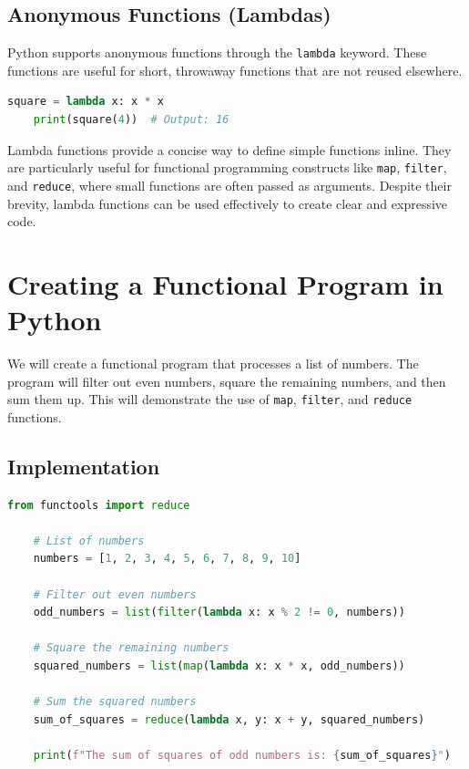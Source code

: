 \documentclass[a4paper]{article}
\begin{document}
\subsection{Anonymous Functions (Lambdas)}
Python supports anonymous functions through the \texttt{lambda} keyword. These functions are useful for short, throwaway functions that are not reused elsewhere.\\

\begin{lstlisting}[language=Python, caption=Anonymous Functions (Lambdas)]
    square = lambda x: x * x
    print(square(4))  # Output: 16
\end{lstlisting}

Lambda functions provide a concise way to define simple functions inline. They are particularly useful for functional programming constructs like \texttt{map}, \texttt{filter}, and \texttt{reduce}, where small functions are often passed as arguments. Despite their brevity, lambda functions can be used effectively to create clear and expressive code.\\

\newpage
\section{Creating a Functional Program in Python}
We will create a functional program that processes a list of numbers. The program will filter out even numbers, square the remaining numbers, and then sum them up. This will demonstrate the use of \texttt{map}, \texttt{filter}, and \texttt{reduce} functions.\\

\subsection{Implementation}

\begin{lstlisting}[language=Python, caption=Functional Program Demo]
    from functools import reduce

    # List of numbers
    numbers = [1, 2, 3, 4, 5, 6, 7, 8, 9, 10]

    # Filter out even numbers
    odd_numbers = list(filter(lambda x: x % 2 != 0, numbers))

    # Square the remaining numbers
    squared_numbers = list(map(lambda x: x * x, odd_numbers))

    # Sum the squared numbers
    sum_of_squares = reduce(lambda x, y: x + y, squared_numbers)

    print(f"The sum of squares of odd numbers is: {sum_of_squares}")
\end{lstlisting}
\end{document}
